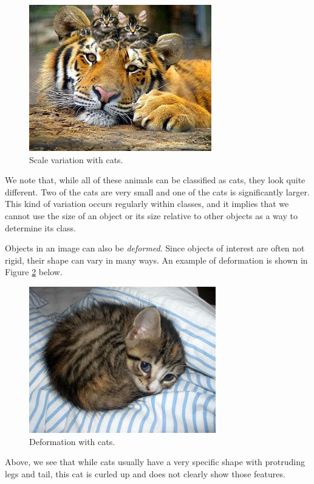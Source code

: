 \begin{figure}[ht!] \centering
\includegraphics[height=2.5in]{../figures/kitty_scale_variation.jpg}
\caption{Scale variation with cats.} \label{fig:scale_variation} \end{figure}

\noindent We note that, while all of these animals can be classified as cats,
they look quite different. Two of the cats are very small and one of the cats
is significantly larger. This kind of variation occurs regularly within
classes, and it implies that we cannot use the size of an object or its size
relative to other objects as a way to determine its class.

\noindent Objects in an image can also be \textit{deformed}. Since objects of interest
are often not rigid, their shape can vary in many ways. An example of
deformation is shown in Figure \ref{fig:deformation} below.

\begin{figure}[ht!] \centering
\includegraphics[height=2.5in]{../figures/kitty_deformed.jpg}
\caption{Deformation with cats.} \label{fig:deformation} \end{figure}

\noindent Above, we see that while cats usually have a very specific shape with
protruding legs and tail, this cat is curled up and does not clearly show those
features.

